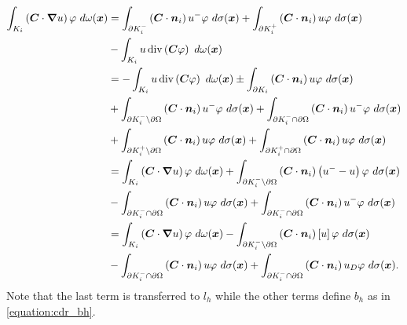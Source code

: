 \begin{align}
    \int_{K_i} \left( \bm{C} \cdot \bm{\nabla} u \right) \varphi ~ d \omega(\bm{x}) &= \int_{\partial K_i^-} \left( \bm{C} \cdot \bm{n}_i \right) u^- \varphi ~ d \sigma(\bm{x}) + \int_{\partial K_i^+} \left( \bm{C} \cdot \bm{n}_i \right) u \varphi ~ d \sigma(\bm{x}) \notag \\
    &- \int_{K_i} u \operatorname*{div} \left( \bm{C} \varphi \right) ~ d \omega(\bm{x}) \notag \\
    &= - \int_{K_i} u \operatorname*{div} \left( \bm{C} \varphi \right) ~ d \omega(\bm{x}) \pm \int_{\partial K_i} \left( \bm{C} \cdot \bm{n}_i \right) u \varphi ~ d \sigma(\bm{x}) \notag \\
    &+ \int_{\partial K_i^- \setminus \partial \Omega} \left( \bm{C} \cdot \bm{n}_i \right) u^- \varphi ~ d \sigma(\bm{x}) + \int_{\partial K_i^- \cap \partial \Omega} \left( \bm{C} \cdot \bm{n}_i \right) u^- \varphi ~ d \sigma(\bm{x}) \notag \\
    &+ \int_{\partial K_i^+ \setminus \partial \Omega} \left( \bm{C} \cdot \bm{n}_i \right) u \varphi ~ d \sigma(\bm{x}) + \int_{\partial K_i^+ \cap \partial \Omega} \left( \bm{C} \cdot \bm{n}_i \right) u \varphi ~ d \sigma(\bm{x}) \notag \\
    &= \int_{K_i} \left( \bm{C} \cdot \bm{\nabla} u \right) \varphi ~ d \omega(\bm{x}) + \int_{\partial K_i^- \setminus \partial \Omega} \left( \bm{C} \cdot \bm{n}_i \right) \left( u^- - u \right) \varphi ~ d \sigma(\bm{x}) \notag \\
    &- \int_{\partial K_i^- \cap \partial \Omega} \left( \bm{C} \cdot \bm{n}_i \right) u \varphi ~ d \sigma(\bm{x}) + \int_{\partial K_i^- \cap \partial \Omega} \left( \bm{C} \cdot \bm{n}_i \right) u^- \varphi ~ d \sigma(\bm{x}) \notag \\
    &= \int_{K_i} \left( \bm{C} \cdot \bm{\nabla} u \right) \varphi ~ d \omega(\bm{x}) - \int_{\partial K_i^- \setminus \partial \Omega} \left( \bm{C} \cdot \bm{n}_i \right) \left[ u \right] \varphi ~ d \sigma(\bm{x}) \\
    &- \int_{\partial K_i^- \cap \partial \Omega} \left( \bm{C} \cdot \bm{n}_i \right) u \varphi ~ d \sigma(\bm{x}) + \int_{\partial K_i^- \cap \partial \Omega} \left( \bm{C} \cdot \bm{n}_i \right) u_D \varphi ~ d \sigma(\bm{x}). \notag
\end{align}
Note that the last term is transferred to $l_h$ while the other terms define $b_h$ as in \cref{equation:cdr_bh}.

